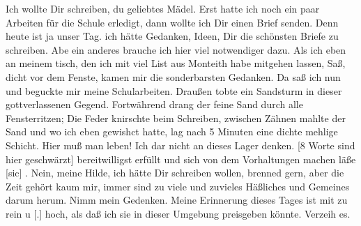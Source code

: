 \def\day{Medicine Hat, 1. Mai 1944.}
\mktitle

Ich wollte Dir schreiben, du geliebtes M\"{a}del.
Erst hatte ich noch ein paar Arbeiten f\"{u}r die Schule erledigt, dann wollte ich Dir einen Brief senden.
Denn heute ist ja unser Tag.
ich h\"{a}tte Gedanken, Ideen, Dir die sch\"{o}nsten Briefe zu schreiben.
Abe ein anderes brauche ich hier viel notwendiger dazu.
Als ich eben an meinem tisch, den ich mit viel List aus Monteith habe mitgehen lassen, Sa{\ss}, dicht vor dem Fenste, kamen mir die sonderbarsten Gedanken.
Da sa{\ss} ich nun und beguckte mir meine Schularbeiten.
Drau{\ss}en tobte ein Sandsturm in dieser gottverlassenen Gegend.
Fortw\"{a}hrend drang der feine  Sand durch alle Fensterritzen; Die Feder knirschte beim Schreiben, zwischen Z\"{a}hnen mahlte der Sand und wo ich eben gewishct hatte, lag nach 5 Minuten eine dichte mehlige Schicht.
Hier mu{\ss} man leben!
Ich dar nicht an dieses Lager denken.
{\color{red} [8 Worte sind hier geschw\"{a}rzt] }
bereitwilligst erf\"{u}llt und sich von dem Vorhaltungen machen l\"{a}{\ss}e{\color{red} [sic] }.
Nein, meine Hilde, ich h\"{a}tte Dir schreiben wollen, brenned gern, aber die Zeit geh\"{o}rt kaum mir, immer sind zu viele und zuvieles H\"{a}{\ss}liches und Gemeines darum herum.
Nimm mein Gedenken.
Meine Erinnerung dieses Tages ist mit zu rein u{\color{red} [.] } hoch, als da{\ss} ich sie in dieser Umgebung preisgeben k\"{o}nnte.
Verzeih es.

\clearpage
